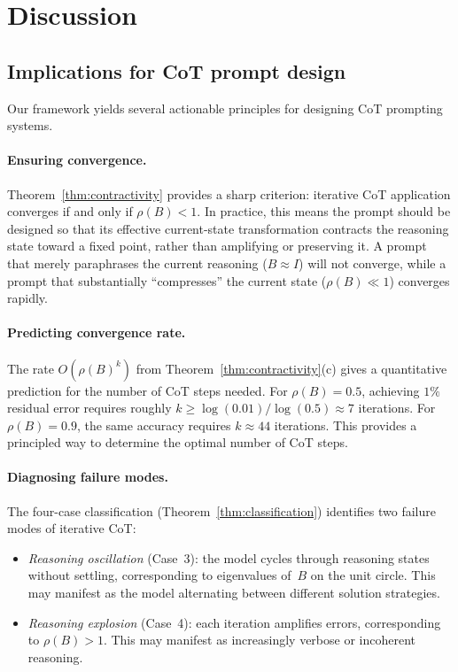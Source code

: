 \section{Discussion}\label{sec:discussion}

\subsection{Implications for CoT prompt design}

Our framework yields several actionable principles for designing CoT prompting
systems.

\paragraph{Ensuring convergence.}
Theorem~\ref{thm:contractivity} provides a sharp criterion: iterative CoT
application converges if and only if $\rho(B)<1$. In practice, this means
the prompt should be designed so that its effective current-state transformation
contracts the reasoning state toward a fixed point, rather than amplifying or
preserving it. A prompt that merely paraphrases the current reasoning
($B\approx I$) will not converge, while a prompt that substantially
``compresses'' the current state ($\rho(B)\ll 1$) converges rapidly.

\paragraph{Predicting convergence rate.}
The rate $O(\rho(B)^k)$ from Theorem~\ref{thm:contractivity}(c) gives a
quantitative prediction for the number of CoT steps needed. For $\rho(B)=0.5$,
achieving $1\%$ residual error requires roughly $k\geq\log(0.01)/\log(0.5)
\approx 7$ iterations. For $\rho(B)=0.9$, the same accuracy requires
$k\approx 44$ iterations. This provides a principled way to determine the
optimal number of CoT steps.

\paragraph{Diagnosing failure modes.}
The four-case classification (Theorem~\ref{thm:classification}) identifies
two failure modes of iterative CoT:
\begin{itemize}
  \item \emph{Reasoning oscillation} (Case~3): the model cycles through
    reasoning states without settling, corresponding to eigenvalues of~$B$ on
    the unit circle. This may manifest as the model alternating between
    different solution strategies.
  \item \emph{Reasoning explosion} (Case~4): each iteration amplifies errors,
    corresponding to $\rho(B)>1$. This may manifest as increasingly verbose or
    incoherent reasoning.
\end{itemize}

